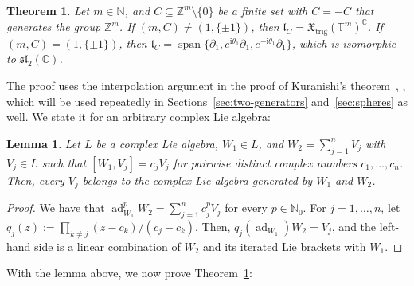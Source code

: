 \documentclass{article}
\newcommand{\N}{\mathbb{N}}
\newcommand{\C}{\mathbb{C}}
\newcommand{\Z}{\mathbb{Z}}
\newcommand{\T}{\mathbb{T}}
\newcommand{\xtrig}{\mathfrak X_{\mathrm{trig}}}
\newtheorem{theorem}{Theorem}
\newtheorem{lemma}{Lemma}
\theoremstyle{definition}
\theoremstyle{plain}
\begin{document}
\begin{theorem}\label{thm:torus}
Let $m\in\N$, and $C\subseteq\Z^m\setminus\{0\}$ be a finite set with $C=-C$ that generates the group $\Z^m$.
If $(m,C)\neq(1,\{\pm1\})$, then $\mathfrak l_C=\xtrig(\T^m)^\C$.
If $(m,C)=(1,\{\pm1\})$, then $\mathfrak l_C=\operatorname{span}\{\partial_1,e^{\mathrm{i}\theta_1}\partial_1,e^{-\mathrm{i}\theta_1}\partial_1\}$, which is isomorphic to $\mathfrak{sl}_2(\C)$.
\end{theorem}

The proof uses the interpolation argument in the proof of Kuranishi's theorem~\cite{Kuranishi49}, \cite[Theorem~6]{Kuranishi51}, which will be used repeatedly in Sections~\ref{sec:two-generators} and~\ref{sec:spheres} as well.
We state it for an arbitrary complex Lie algebra:

\begin{lemma}\label{lem:interpolation}
Let $L$ be a complex Lie algebra, $W_1\in L$, and $W_2=\sum_{j=1}^nV_j$ with $V_j\in L$ such that $[W_1,V_j]=c_jV_j$ for pairwise distinct complex numbers $c_1,\ldots,c_n$. Then, every $V_j$ belongs to the complex Lie algebra generated by $W_1$ and $W_2$.
\end{lemma}

\begin{proof}
We have that $\operatorname{ad}_{W_1}^pW_2=\sum_{j=1}^nc_j^pV_j$ for every $p\in\N_0$.
For $j=1,\ldots,n$, let $q_j(z):=\prod_{k\neq j}(z-c_k)/(c_j-c_k)$. Then, $q_j(\operatorname{ad}_{W_1})W_2=V_j$, and the left-hand side is a linear combination of $W_2$ and its iterated Lie brackets with $W_1$.
\end{proof}

With the lemma above, we now prove Theorem~\ref{thm:torus}:
\end{document}

